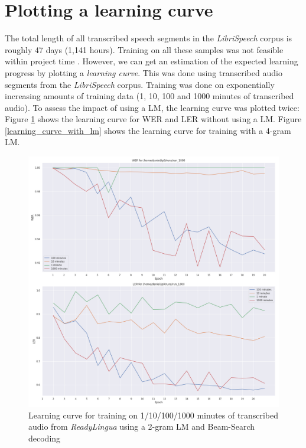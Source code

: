 \section{Plotting a learning curve}

The total length of all transcribed speech segments in the \textit{LibriSpeech} corpus is roughly 47 days (1,141 hours). Training on all these samples was not feasible within project time . However, we can get an estimation of the expected learning progress by plotting a \textit{learning curve}. This was done using transcribed audio segments from the \textit{LibriSpeech} corpus. Training was done on exponentially increasing amounts of training data (1, 10, 100 and 1000 minutes of transcribed audio). To assess the impact of using a \ac{LM}, the learning curve was plotted twice: Figure \ref{learning_curve_without_lm} shows the learning curve for \ac{WER} and \ac{LER} without using a \ac{LM}. Figure \ref{learning_curve_with_lm} shows the learning curve for training with a 4-gram \ac{LM}.

\begin{figure}
	\includegraphics[width=\linewidth]{./img/learning_curve_lm_beamsearch.png}
	\caption{Learning curve for training on 1/10/100/1000 minutes of transcribed audio from \textit{ReadyLingua} using a 2-gram \ac{LM} and Beam-Search decoding}
	\label{learning_curve_without_lm}
\end{figure}

